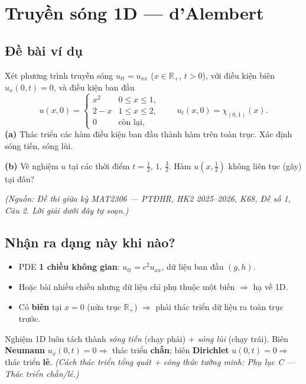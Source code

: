 
\section{Truyền sóng 1D --- d'Alembert}

\subsection*{Đề bài ví dụ}
Xét phương trình truyền sóng $u_{tt}=u_{xx}$ ($x\in\mathbb{R}_+$, $t>0$), với điều kiện biên
$u_x(0,t)=0$, và điều kiện ban đầu
\[
  u(x,0)=\begin{cases}
    x^2 & 0\le x\le 1,\\
    2-x & 1\le x\le 2,\\
    0 & \text{còn lại},
  \end{cases}
  \qquad
  u_t(x,0)=\chi_{(0,1)}(x).
\]
\textbf{(a)} Thác triển các hàm điều kiện ban đầu thành hàm trên toàn trục. Xác định sóng tiến, sóng lùi.

\textbf{(b)} Vẽ nghiệm $u$ tại các thời điểm $t=\tfrac12,\,1,\,\tfrac32$. Hàm $u(x,\tfrac12)$ không liên tục (gãy) tại đâu?

\emph{\small(Nguồn: Đề thi giữa kỳ MAT2306 --- PTĐHR, HK2 2025--2026, K68, Đề số 1, Câu 2. Lời giải dưới đây tự soạn.)}

\subsection*{Nhận ra dạng này khi nào?}
\begin{itemize}
  \item PDE \textbf{1 chiều không gian}: $u_{tt}=c^2 u_{xx}$, dữ liệu ban đầu $(g,h)$.
  \item Hoặc bài nhiều chiều nhưng dữ liệu chỉ phụ thuộc một biến $\Rightarrow$ hạ về 1D.
  \item Có \textbf{biên} tại $x=0$ (nửa trục $\mathbb{R}_+$) $\Rightarrow$ phải thác triển dữ liệu ra toàn trục trước.
\end{itemize}
\begin{meobox}
Nghiệm 1D luôn tách thành \emph{sóng tiến} (chạy phải) $+$ \emph{sóng lùi} (chạy trái).
Biên \textbf{Neumann} $u_x(0,t)=0\Rightarrow$ thác triển \textbf{chẵn}; biên \textbf{Dirichlet} $u(0,t)=0\Rightarrow$ thác triển \textbf{lẻ}.
\emph{(Cách thác triển tổng quát + công thức tường minh: Phụ lục C --- Thác triển chẵn/lẻ.)}
\end{meobox}

